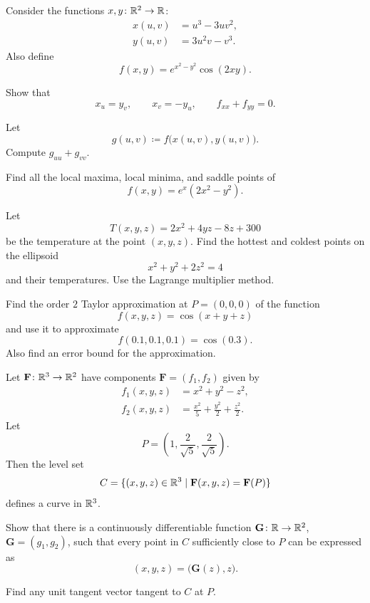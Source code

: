 \begin{problem}
Consider the functions $x, y\colon\mathbb{R}^2\to\mathbb{R}$:
\[
\begin{aligned}
x(u, v)&=u^3-3uv^2, \\
y(u, v)&=3u^2v-v^3.
\end{aligned}
\]
Also define
\[
f(x, y)=e^{x^2-y^2}\cos(2xy).
\]
\begin{problemsubparts}
\item Show that
\[
x_u=y_v,
\qquad
x_v=-y_u,
\qquad
f_{xx}+f_{yy}=0.
\]
\item Let
\[
g(u, v)\coloneqq f\bigl(x(u, v), y(u, v)\bigr).
\]
Compute $g_{uu}+g_{vv}$.
\end{problemsubparts}
\end{problem}

\begin{problem}
Find all the local maxima, local minima, and saddle points of
\[
f(x, y)=e^x(2x^2-y^2).
\]
\end{problem}

\begin{problem}
Let
\[
T(x, y, z)=2x^2+4yz-8z+300
\]
be the temperature at the point $(x, y, z)$. Find the hottest and coldest points on the ellipsoid
\[
x^2+y^2+2z^2=4
\]
and their temperatures. Use the Lagrange multiplier method.
\end{problem}

\begin{problem}
Find the order $2$ Taylor approximation at $P=(0, 0, 0)$ of the function
\[
f(x, y, z)=\cos(x+y+z)
\]
and use it to approximate
\[
f(0.1, 0.1, 0.1)=\cos(0.3).
\]
Also find an error bound for the approximation.
\end{problem}

\begin{problem}
Let $\mathbf F\colon\mathbb{R}^3\to\mathbb{R}^2$ have components $\mathbf F=(f_1, f_2)$ given by
\[
\begin{aligned}
f_1(x, y, z)&=x^2+y^2-z^2, \\
f_2(x, y, z)&=\frac{x^2}{5}+\frac{y^2}{2}+\frac{z^2}{2}.
\end{aligned}
\]
Let
\[
P=\left(1, \frac{2}{\sqrt5}, \frac{2}{\sqrt5}\right).
\]
Then the level set
\[
C=\{(x, y, z)\in\mathbb{R}^3\mid \mathbf F(x, y, z)=\mathbf F(P)\}
\]
defines a curve in $\mathbb{R}^3$.
\begin{problemsubparts}
\item Show that there is a continuously differentiable function $\mathbf G\colon\mathbb{R}\to\mathbb{R}^2$, $\mathbf G=(g_1, g_2)$, such that every point in $C$ sufficiently close to $P$ can be expressed as
\[
(x, y, z)=\bigl(\mathbf G(z), z\bigr).
\]
\item Find any unit tangent vector tangent to $C$ at $P$.
\end{problemsubparts}
\end{problem}

